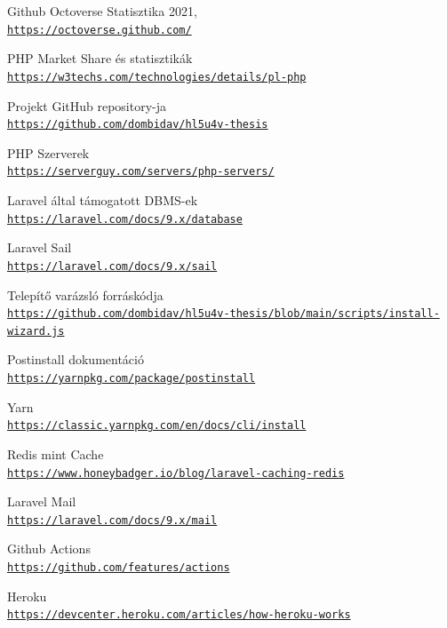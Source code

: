 \documentclass[a4paper,12pt]{thesis-ekf}
\theoremstyle{definition}
\begin{document}
\begin{thebibliography}{2}

    Github Octoverse Statisztika 2021,
    \\\texttt{\url{https://octoverse.github.com/}}
    
    PHP Market Share és statisztikák
    \\\texttt{\url{https://w3techs.com/technologies/details/pl-php}}
    
    Projekt GitHub repository-ja
    \\\texttt{\url{https://github.com/dombidav/hl5u4v-thesis}}
    
    PHP Szerverek
    \\\texttt{\url{https://serverguy.com/servers/php-servers/}}
    
    Laravel által támogatott DBMS-ek
    \\\texttt{\url{https://laravel.com/docs/9.x/database}}
    
    Laravel Sail
    \\\texttt{\url{https://laravel.com/docs/9.x/sail}}
    
    Telepítő varázsló forráskódja
    \\\texttt{\url{https://github.com/dombidav/hl5u4v-thesis/blob/main/scripts/install-wizard.js}}
    
    Postinstall dokumentáció
    \\\texttt{\url{https://yarnpkg.com/package/postinstall}}
    
    Yarn
    \\\texttt{\url{https://classic.yarnpkg.com/en/docs/cli/install}}
    
    Redis mint Cache
    \\\texttt{\url{https://www.honeybadger.io/blog/laravel-caching-redis}}
    
    Laravel Mail
    \\\texttt{\url{https://laravel.com/docs/9.x/mail}}
    
    Github Actions
    \\\texttt{\url{https://github.com/features/actions}}
    
    Heroku
    \\\texttt{\url{https://devcenter.heroku.com/articles/how-heroku-works}}
    

\end{thebibliography}
\end{document}
